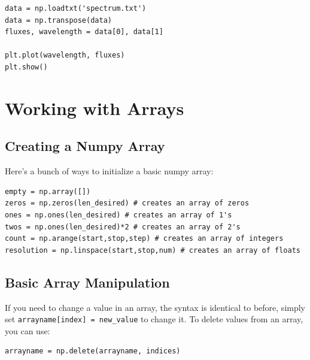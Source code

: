 \begin{lstlisting}
data = np.loadtxt('spectrum.txt')
data = np.transpose(data)
fluxes, wavelength = data[0], data[1]

plt.plot(wavelength, fluxes)
plt.show()
\end{lstlisting}

\section{Working with Arrays}
\subsection{Creating a Numpy Array}
Here's a bunch of ways to initialize a basic numpy array:

\begin{lstlisting}
empty = np.array([])
zeros = np.zeros(len_desired) # creates an array of zeros
ones = np.ones(len_desired) # creates an array of 1's
twos = np.ones(len_desired)*2 # creates an array of 2's
count = np.arange(start,stop,step) # creates an array of integers
resolution = np.linspace(start,stop,num) # creates an array of floats
\end{lstlisting}

\subsection{Basic Array Manipulation}
If you need to change a value in an array, the syntax is identical to before, simply set \texttt{arrayname[index] = new\_value} to change it. To delete values from an array, you can use:

\begin{lstlisting}
arrayname = np.delete(arrayname, indices)
\end{lstlisting}